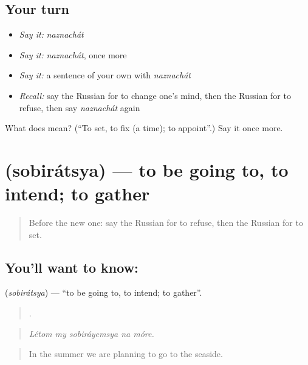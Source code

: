 \subsection*{Your turn}
\begin{itemize}
\raggedright
  \item \emph{Say it:} \emph{naznachát}
  \item \emph{Say it:} \emph{naznachát}, once more
  \item \emph{Say it:} a sentence of your own with \emph{naznachát}
  \item \emph{Recall:} say the Russian for to change one’s mind, then the Russian for to refuse, then say \emph{naznachát} again
\end{itemize}

\begin{tcolorbox}[breakable,colback=teal!4,colframe=teal!35!black,title={Before you move on}]
What does  mean? (\textquotedblleft{}To set, to fix (a time); to appoint\textquotedblright{}.) Say it once more.
\end{tcolorbox}
\section[\texorpdfstring{\ru{собираться} (sobirátsya)}{собираться (sobirátsya)}]{ (sobirátsya) — to be going to, to intend; to gather}

\label{lesson:RU-C377-sobiratsya}



\begin{quote}
Before the new one: say the Russian for to refuse, then the Russian for to set.
\end{quote}

\subsection*{You'll want to know: }
\textbf{} (\emph{sobirátsya}) — \textquotedblleft{}to be going to, to intend; to gather\textquotedblright{}.

\begin{quote}
    .
\end{quote}

\begin{quote}
\emph{Létom my sobiráyemsya na móre.}
\end{quote}

\begin{quote}
In the summer we are planning to go to the seaside.
\end{quote}

